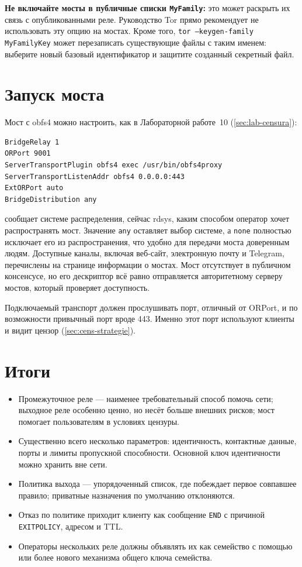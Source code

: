 \textbf{Не включайте мосты в публичные списки \texttt{MyFamily}:} это может раскрыть их связь с опубликованными реле. Руководство Tor прямо рекомендует не использовать эту опцию на мостах. Кроме того, \texttt{tor --keygen-family MyFamilyKey} может перезаписать существующие файлы с таким именем: выберите новый базовый идентификатор и защитите созданный секретный файл.

\section{Запуск моста}\label{sec:relay-bridge}

Мост с obfs4 можно настроить, как в Лабораторной работе~10 (\cref{sec:lab-censura}):
\begin{lstlisting}[numbers=none]
BridgeRelay 1
ORPort 9001
ServerTransportPlugin obfs4 exec /usr/bin/obfs4proxy
ServerTransportListenAddr obfs4 0.0.0.0:443
ExtORPort auto
BridgeDistribution any
\end{lstlisting}
 сообщает системе распределения, сейчас rdsys, каким способом оператор хочет распространять мост. Значение \texttt{any} оставляет выбор системе, а \texttt{none} полностью исключает его из распространения, что удобно для передачи моста доверенным людям. Доступные каналы, включая веб-сайт, электронную почту и Telegram, перечислены на странице информации о мостах. Мост отсутствует в публичном консенсусе, но его дескриптор всё равно отправляется авторитетному серверу мостов, который проверяет доступность.

Подключаемый транспорт должен прослушивать порт, отличный от ORPort, и по возможности привычный порт вроде 443. Именно этот порт используют клиенты и видит цензор (\cref{sec:cens-strategie}).

\section*{Итоги}
\begin{itemize}
  \item Промежуточное реле — наименее требовательный способ помочь сети; выходное реле особенно ценно, но несёт больше внешних рисков; мост помогает пользователям в условиях цензуры.
  \item Существенно всего несколько параметров: идентичность, контактные данные, порты и лимиты пропускной способности. Основной ключ идентичности можно хранить вне сети.
  \item Политика выхода — упорядоченный список, где побеждает первое совпавшее правило; приватные назначения по умолчанию отклоняются.
  \item Отказ по политике приходит клиенту как сообщение \texttt{END} с причиной \texttt{EXITPOLICY}, адресом и TTL.
  \item Операторы нескольких реле должны объявлять их как семейство с помощью  или более нового механизма общего ключа семейства.
\end{itemize}

